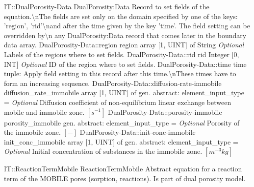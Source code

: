 \begin{RecordType}
	{IT::DualPorosity-Data}
	{DualPorosity:Data}
	{}%
	{}%
	{{{Record to set fields of the equation.{\textbackslash}nThe fields are set only on the domain specified by one of the keys: 'region', 'rid'{\textbackslash}nand after the time given by the key 'time'. The field setting can be overridden by{\textbackslash}n any DualPorosity:Data record that comes later in the boundary data array.}%
}}
		\RecKey
			{DualPorosity-Data::region}
			{region}
			{{array [1, UINT] of }{String}}{}
			{ \it{Optional}}
			{{{Labels of the regions where to set fields. }%
}}
		\RecKey
			{DualPorosity-Data::rid}
			{rid}
			{{Integer [0, INT]}}{}
			{ \it{Optional}}
			{{{ID of the region where to set fields.}%
}}
		\RecKey
			{DualPorosity-Data::time}
			{time}
			{{tuple: }}{}
			{ }
			{{{Apply field setting in this record after this time.{\textbackslash}nThese times have to form an increasing sequence.}%
}}
		\RecKey
			{DualPorosity-Data::diffusion-rate-immobile}
			{diffusion{\_}rate{\_}immobile}
			{{array [1, UINT] of }{gen. abstract: }}{{element{\_}input{\_}type}{ = }}
			{ \it{Optional}}
			{{{Diffusion coefficient of non-equilibrium linear exchange between mobile and immobile zone. }{$[s^{-1}]$}%
}}
		\RecKey
			{DualPorosity-Data::porosity-immobile}
			{porosity{\_}immobile}
			{{gen. abstract: }}{{element{\_}input{\_}type}{ = }}
			{ \it{Optional}}
			{{{Porosity of the immobile zone. }{$[-]$}%
}}
		\RecKey
			{DualPorosity-Data::init-conc-immobile}
			{init{\_}conc{\_}immobile}
			{{array [1, UINT] of }{gen. abstract: }}{{element{\_}input{\_}type}{ = }}
			{ \it{Optional}}
			{{{Initial concentration of substances in the immobile zone. }{$[m^{-3}kg]$}%
}}
\end{RecordType}
\begin{AbstractType}
	{IT::ReactionTermMobile}
	{ReactionTermMobile}
	{}
	{{{Abstract equation for a reaction term of the MOBILE pores (sorption, reactions). Is part of dual porosity model.}%
}}
\end{AbstractType}
